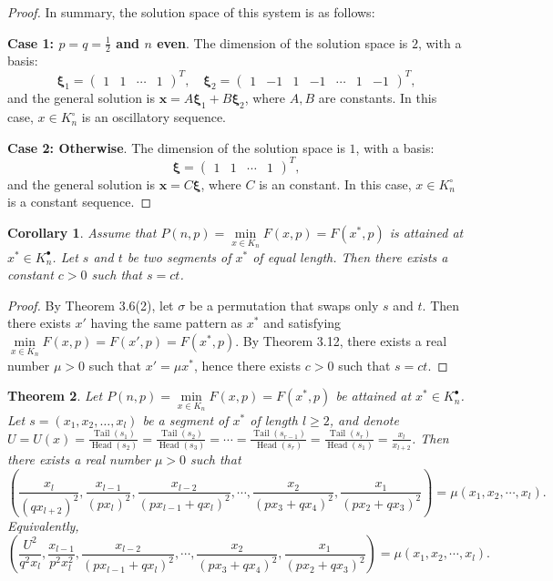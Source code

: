 \documentclass[a4paper,fleqn,numbers]{cas-sc}
\newtheorem{theorem}{Theorem}[section]
\newtheorem{corollary}[theorem]{Corollary}
\DeclareMathOperator{\Head}{Head}
\DeclareMathOperator{\Tail}{Tail}
\begin{document}
\begin{proof}
		In summary, the solution space of this system is as follows:
		
		\textbf{Case 1: \(p=q=\frac{1}{2}\) and \(n\) even}. The dimension of the solution space is \(2\), with a basis:
		\[
		\boldsymbol{\xi}_1 = \begin{pmatrix} 1 & 1 & \cdots & 1 \end{pmatrix}^T, \quad
		\boldsymbol{\xi}_2 = \begin{pmatrix} 1 & -1 & 1 & -1 & \cdots & 1 & -1 \end{pmatrix}^T,
		\]
		and the general solution is \(\mathbf{x} = A \boldsymbol{\xi}_1 + B \boldsymbol{\xi}_2\), where \(A,B\) are constants. In this case, \(x\in K_n^{\circ}\) is an oscillatory sequence.
		
		\textbf{Case 2: Otherwise}. The dimension of the solution space is \(1\), with a basis:
		\[
		\boldsymbol{\xi} = \begin{pmatrix} 1 & 1 & \cdots & 1 \end{pmatrix}^T,
		\]
		and the general solution is \(\mathbf{x} = C \boldsymbol{\xi}\), where \(C\) is an constant. In this case, \(x\in K_n^{\circ}\) is a constant sequence.
	\end{proof}
	
	\begin{corollary}
		Assume that \(P(n,p)=\min\limits_{x \in K_n} F(x,p) = F(x^*,p)\) is attained at \(x^* \in K_n^{\bullet}\). Let \(s\) and \(t\) be two segments of \(x^*\) of equal length. Then there exists a constant \(c > 0\) such that \(s = c t\).
	\end{corollary}
	
	\begin{proof}
		By Theorem 3.6(2), let \(\sigma\) be a permutation that swaps only \(s\) and \(t\). Then there exists \(x'\) having the same pattern as \(x^*\) and satisfying \(\min\limits_{x \in K_n}F(x,p)=F(x',p)=F(x^*,p)\). By Theorem 3.12, there exists a real number \(\mu >0\) such that \(x'=\mu x^*\), hence there exists \(c>0\) such that \(s=ct\).
	\end{proof}
	
	\begin{theorem}
		Let \(P(n,p)=\min\limits_{x \in K_n} F(x, p) = F(x^*, p)\) be attained at \(x^* \in K_n^{\bullet}\). Let \(s = (x_1, x_2, \dots, x_l)\) be a segment of \(x^*\) of length \(l \geq 2\), and denote \(U = U(x) =\frac{\Tail(s_1)}{\Head(s_2)} = \frac{\Tail(s_2)}{\Head(s_3)} = \cdots = \frac{\Tail(s_{r-1})}{\Head(s_r)} = \frac{\Tail(s_r)}{\Head(s_1)}= \frac{x_l}{x_{l+2}}\). Then there exists a real number \(\mu > 0\) such that
		\[
		\left( \frac{x_l}{(q x_{l+2})^2}, \frac{x_{l-1}}{(p x_l)^2}, \frac{x_{l-2}}{(p x_{l-1} + q x_l)^2}, \cdots, \frac{x_2}{(p x_3 + q x_4)^2}, \frac{x_1}{(p x_2 + q x_3)^2} \right) = \mu (x_1, x_2, \cdots, x_l).
		\]
		Equivalently,
		\[
		\left( \frac{U^2}{q^2 x_l}, \frac{x_{l-1}}{p^2 x_l^2}, \frac{x_{l-2}}{(p x_{l-1} + q x_l)^2}, \cdots, \frac{x_2}{(p x_3 + q x_4)^2}, \frac{x_1}{(p x_2 + q x_3)^2} \right) = \mu (x_1, x_2, \cdots, x_l).
		\]
	\end{theorem}
	
\end{document}
